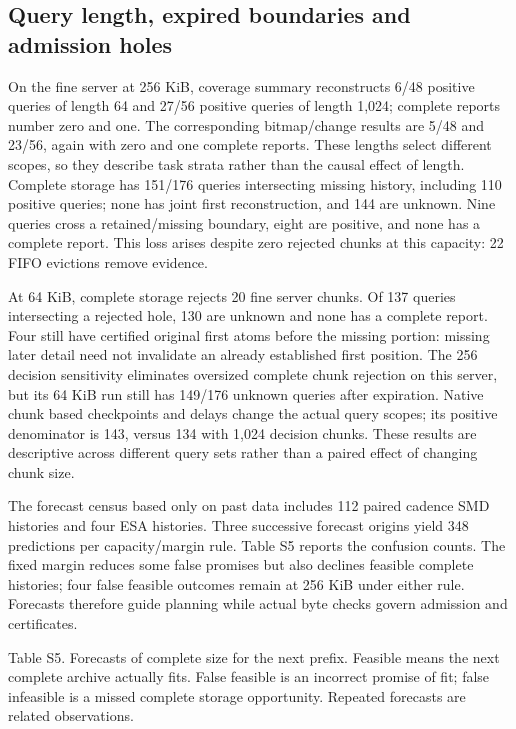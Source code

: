 \documentclass[11pt]{article}
\begin{document}
\subsection*{Query length, expired boundaries and admission holes}
On the fine server at 256 KiB, coverage summary reconstructs 6/48 positive queries of length 64 and 27/56 positive queries of length 1,024; complete reports number zero and one. The corresponding bitmap/change results are 5/48 and 23/56, again with zero and one complete reports. These lengths select different scopes, so they describe task strata rather than the causal effect of length. Complete storage has 151/176 queries intersecting missing history, including 110 positive queries; none has joint first reconstruction, and 144 are unknown. Nine queries cross a retained/missing boundary, eight are positive, and none has a complete report. This loss arises despite zero rejected chunks at this capacity: 22 FIFO evictions remove evidence.

At 64 KiB, complete storage rejects 20 fine server chunks. Of 137 queries intersecting a rejected hole, 130 are unknown and none has a complete report. Four still have certified original first atoms before the missing portion: missing later detail need not invalidate an already established first position. The 256 decision sensitivity eliminates oversized complete chunk rejection on this server, but its 64 KiB run still has 149/176 unknown queries after expiration. Native chunk based checkpoints and delays change the actual query scopes; its positive denominator is 143, versus 134 with 1,024 decision chunks. These results are descriptive across different query sets rather than a paired effect of changing chunk size.

The forecast census based only on past data includes 112 paired cadence SMD histories and four ESA histories. Three successive forecast origins yield 348 predictions per capacity/margin rule. Table S5 reports the confusion counts. The fixed margin reduces some false promises but also declines feasible complete histories; four false feasible outcomes remain at 256 KiB under either rule. Forecasts therefore guide planning while actual byte checks govern admission and certificates.

Table S5. Forecasts of complete size for the next prefix. Feasible means the next complete archive actually fits. False feasible is an incorrect promise of fit; false infeasible is a missed complete storage opportunity. Repeated forecasts are related observations.
\end{document}
